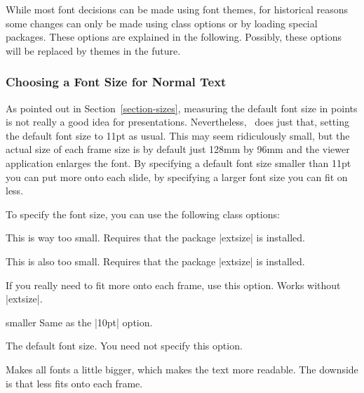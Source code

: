 While most font decisions can be made using font themes, for historical reasons some changes can only be made using class options or by loading special packages. These options are explained in the following. Possibly, these options will be replaced by themes in the future.

\subsubsection{Choosing a Font Size for Normal Text}

As pointed out in Section~\ref{section-sizes}, measuring the default font size in points is not really a good idea for presentations. Nevertheless, \beamer\ does just that, setting the default font size to 11pt as usual. This may seem ridiculously small, but the actual size of each frame size is by default just 128mm by 96mm and the viewer application enlarges the font. By specifying a default font size smaller than 11pt you can put more onto each slide, by specifying a larger font size you can fit on less.

To specify the font size, you can use the following class options:

\begin{classoption}{8pt}
  This is way too small. Requires that the package |extsize| is installed.
\end{classoption}

\begin{classoption}{9pt}
  This is also too small. Requires that the package |extsize| is installed.
\end{classoption}

\begin{classoption}{10pt}
  If you really need to fit more onto each frame, use this option. Works without |extsize|.
\end{classoption}

\begin{classoption}{smaller}
  Same as the |10pt| option. \end{classoption}

\begin{classoption}{11pt}
  The default font size. You need not specify this option.
\end{classoption}

\begin{classoption}{12pt}
  Makes all fonts a little bigger, which makes the text more readable. The downside is that less fits onto each frame.
\end{classoption}

